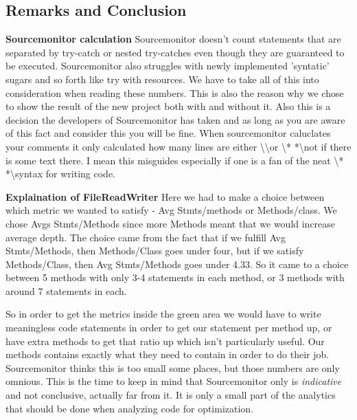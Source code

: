 \documentclass{article}
\begin{document}
\subsection{Remarks and Conclusion}%
\textbf{Sourcemonitor calculation\newline}
Sourcemonitor doesn't count statements that are separated
by try-catch or nested try-catches even though they are guaranteed to be
executed. 
Sourcemonitor also struggles with newly implemented 'syntatic' sugars and so forth like
try with resources. We have to take all of this into consideration when reading these numbers.
This is also the reason why we chose to show the result of the new project both with and without it.
Also this is a decision the developers of Sourcemonitor has taken and as long as you are aware of this fact and consider this you will be fine. \newline
When sourcemonitor caluclates your comments it only calculated how many lines are either \textbackslash \textbackslash or \textbackslash* * *\textbackslash not if there is some text there. I mean this misguides especially if one is a fan of the neat \textbackslash* * *\textbackslash syntax for writing code.


\textbf{Explaination of FileReadWriter\newline}
Here we had to make a choice between which metric we wanted to satisfy -
Avg Stmts/methods or Methods/class. We chose Avgs Stmts/Methods since
more Methods meant that we would increase average depth. The choice
came from the fact that if we fulfill Avg Stmts/Methods, then
Methods/Class goes under four, but if we satisfy Methods/Class, then
Avg Stmts/Methods goes under 4.33. So it came to a choice between
5 methods with only 3-4 statements in each method, or 3 methods with
around 7 statements in each. \newline\newline

So in order to get the metrics inside the green area we would have to
write meaningless code statements in order to get our statement per method up,
or have extra methods to get that ratio up which isn't particularly useful. Our
methods contains exactly what they need to contain in order to do their job. Sourcemonitor
thinks this is too small some places, but those numbers are only omnious. 
This is the time to keep in mind that Sourcemonitor only is \textit{indicative}
and not conclusive, actually far from it. It is only a small part of the analytics
that should be done when analyzing code for optimization. 

\end{document}
